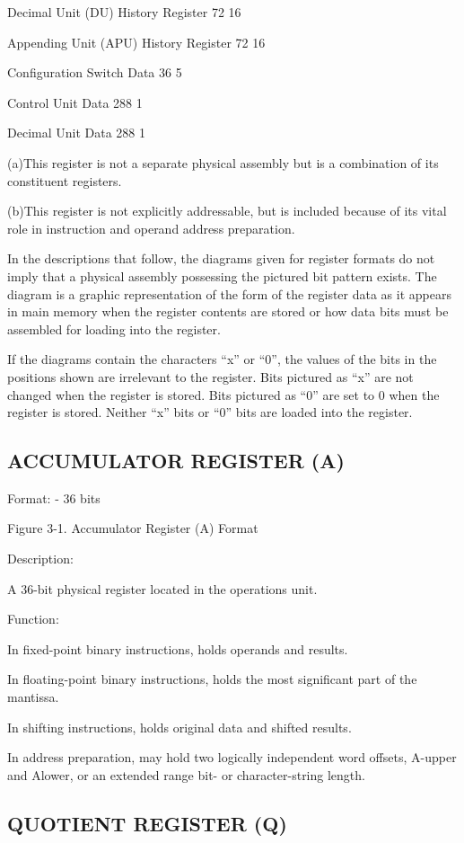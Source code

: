Decimal Unit (DU) History Register 72 16

Appending Unit (APU) History Register 72 16

Configuration Switch Data 36 5

Control Unit Data 288 1

Decimal Unit Data 288 1


(a)This register is not a separate physical assembly but is a combination of
its constituent registers.

(b)This register is not explicitly addressable, but is included because of its
vital role in instruction and operand address preparation.

In the descriptions that follow, the diagrams given for register formats do not
imply that a physical assembly possessing the pictured bit pattern exists.  The
diagram is a graphic representation of the form of the register data as it
appears in main memory when the register contents are stored or how data bits
must be assembled for loading into the register.

If the diagrams contain the characters {``}x'' or {``}0'', the values of the
bits in the positions shown are irrelevant to the register. Bits pictured as
{``}x'' are not changed when the register is stored. Bits pictured as {``}0''
are set to 0 when the register is stored. Neither {``}x'' bits or {``}0'' bits
are loaded into the register.


\subsection{ACCUMULATOR REGISTER (A)}

Format: - 36 bits

Figure 3-1. Accumulator Register (A) Format

Description:

A 36-bit physical register located in the operations unit.

Function:

In fixed-point binary instructions, holds operands and results.

In floating-point binary instructions, holds the most significant part of the
mantissa.

In shifting instructions, holds original data and shifted results.

In address preparation, may hold two logically independent word offsets,
A-upper and Alower, or an extended range bit- or character-string length.

\subsection{QUOTIENT REGISTER (Q)}

